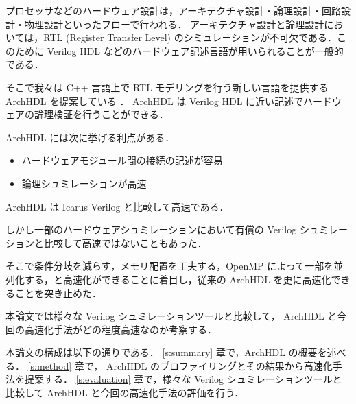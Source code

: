 プロセッサなどのハードウェア設計は，アーキテクチャ設計・論理設計・回路設計・物理設計といったフローで行われる．
アーキテクチャ設計と論理設計においては，RTL (Register Transfer Level)
のシミュレーションが不可欠である．このために Verilog HDL
などのハードウェア記述言語が用いられることが一般的である．

そこで我々は C++ 言語上で RTL モデリングを行う新しい言語を提供する
ArchHDL を提案している \cite{satos:archhdl}． ArchHDL は Verilog HDL
に近い記述でハードウェアの論理検証を行うことができる．

ArchHDL には次に挙げる利点がある．

\begin{itemize}
\itemsep1pt\parskip0pt
\item
  ハードウェアモジュール間の接続の記述が容易
\item
  論理シュミレーションが高速
\end{itemize}

ArchHDL は Icarus Verilog \cite{iverilog}と比較して高速である．

しかし一部のハードウェアシュミレーションにおいて有償の Verilog
シュミレーションと比較して高速ではないこともあった．

そこで条件分岐を減らす，メモリ配置を工夫する，OpenMP
によって一部を並列化する，と高速化ができることに着目し，従来の ArchHDL
を更に高速化できることを突き止めた．

本論文では様々な Verilog シュミレーションツールと比較して， ArchHDL
と今回の高速化手法がどの程度高速なのか考察する．

本論文の構成は以下の通りである． \ref{s:summary} 章で，ArchHDL
の概要を述べる． \ref{s:method} 章で， ArchHDL
のプロファイリングとその結果から高速化手法を提案する．
\ref{s:evaluation} 章で，様々な Verilog シュミレーションツールと比較して
ArchHDL と今回の高速化手法の評価を行う．
